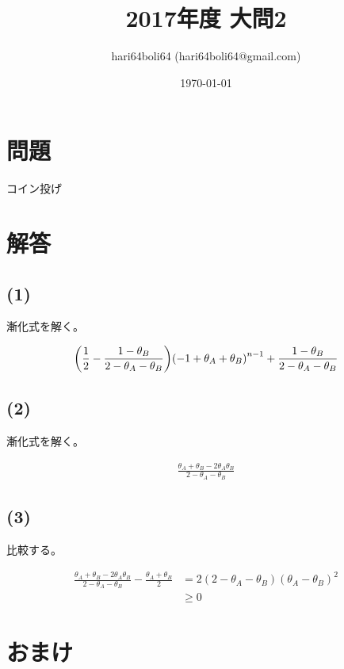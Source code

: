 \documentclass[a4paper, 10pt, dvipdfmx]{jlreq}
\begin{document}
\title{2017年度 大問2}
\author{hari64boli64 (hari64boli64@gmail.com)}
\date{\today}
\maketitle

\section{問題}

コイン投げ

\section{解答}

\subsection*{(1)}

漸化式を解く。

\begin{align*}
  \qty(\frac{1}{2} - \frac{1-\theta_B}{2-\theta_A-\theta_B}) \qty(-1+\theta_A+\theta_B)^{n-1}+\frac{1-\theta_B}{2-\theta_A-\theta_B}
\end{align*}

\subsection*{(2)}

漸化式を解く。

\begin{align*}
  \frac{\theta_A+\theta_B-2\theta_A\theta_B}{2-\theta_A-\theta_B}
\end{align*}

\subsection*{(3)}

比較する。

\begin{align*}
  \frac{\theta_A+\theta_B-2\theta_A\theta_B}{2-\theta_A-\theta_B} - \frac{\theta_A+\theta_B}{2} & = 2(2-\theta_A-\theta_B)(\theta_A-\theta_B)^2 \\
                                                                                                & \geq 0
\end{align*}


\section{おまけ}
\end{document}
